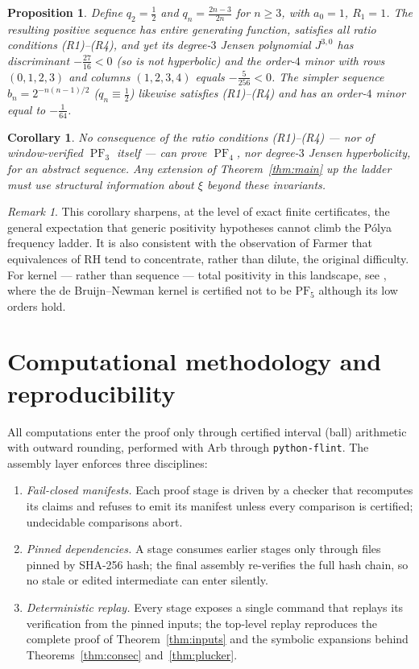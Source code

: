 \documentclass[11pt]{amsart}
\newtheorem{proposition}[theorem]{Proposition}
\newtheorem{corollary}[theorem]{Corollary}
\theoremstyle{definition}
\theoremstyle{remark}
\newtheorem{remark}[theorem]{Remark}
\DeclareMathOperator{\PF}{PF}
\begin{document}
\begin{proposition}\label{prop:cm2}
Define $q_2=\tfrac12$ and $q_n=\tfrac{2n-3}{2n}$ for $n\ge3$, with
$a_0=1$, $R_1=1$. The resulting positive sequence has entire
generating function, satisfies all ratio conditions (R1)--(R4), and yet
its degree-$3$ Jensen polynomial $J^{3,0}$ has discriminant
$-\tfrac{27}{16}<0$ (so is not hyperbolic) and the order-$4$ minor with
rows $(0,1,2,3)$ and columns $(1,2,3,4)$ equals $-\tfrac{5}{256}<0$.
The simpler sequence $b_n=2^{-n(n-1)/2}$ ($q_n\equiv\tfrac12$)
likewise satisfies (R1)--(R4) and has an order-$4$ minor equal to
$-\tfrac{1}{64}$.
\end{proposition}

\begin{corollary}
No consequence of the ratio conditions (R1)--(R4) --- nor of
window-verified $\PF_3$ itself --- can prove $\PF_4$, nor degree-$3$
Jensen hyperbolicity, for an abstract sequence. Any extension of
Theorem~\ref{thm:main} up the ladder must use structural information
about $\xi$ beyond these invariants.
\end{corollary}

\begin{remark}
This corollary sharpens, at the level of exact finite certificates,
the general expectation that generic positivity hypotheses cannot
climb the P\'olya frequency ladder. It is also consistent with the
observation of Farmer \cite{Farmer} that equivalences of RH tend to
concentrate, rather than dilute, the original difficulty. For kernel
--- rather than sequence --- total positivity in this landscape, see
\cite{Michalowski26}, where the de Bruijn--Newman kernel is certified
not to be $\mathrm{PF}_5$ although its low orders hold.
\end{remark}

\section{Computational methodology and reproducibility}\label{sec:comp}

All computations enter the proof only through certified interval
(ball) arithmetic with outward rounding, performed with Arb
\cite{Johansson17} through \texttt{python-flint}. The assembly layer
enforces three disciplines:

\begin{enumerate}
\item \emph{Fail-closed manifests.} Each proof stage is driven by a
checker that recomputes its claims and refuses to emit its manifest
unless every comparison is certified; undecidable comparisons abort.
\item \emph{Pinned dependencies.} A stage consumes earlier stages only
through files pinned by SHA-256 hash; the final assembly re-verifies
the full hash chain, so no stale or edited intermediate can enter
silently.
\item \emph{Deterministic replay.} Every stage exposes a single
command that replays its verification from the pinned inputs;
the top-level replay reproduces the complete proof of
Theorem~\ref{thm:inputs} and the symbolic expansions behind
Theorems~\ref{thm:consec} and~\ref{thm:plucker}.
\end{enumerate}
\end{document}
